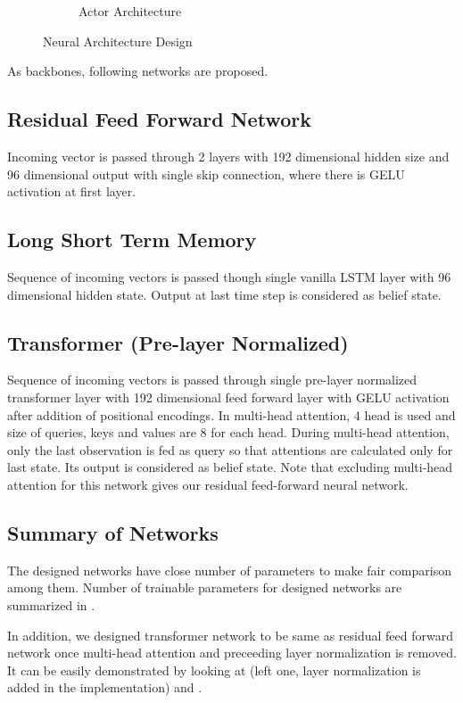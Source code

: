 \begin{figure}
\begin{subfigure}{.5\textwidth}
		\caption{Actor Architecture}
		\label{fig:actor_net}
	\end{subfigure}
	\caption{Neural Architecture Design}
	\label{fig:nets}
\end{figure}

As backbones, following networks are proposed. 

\subsection{Residual Feed Forward Network}

Incoming vector is passed through 2 layers with 192 dimensional hidden size and 96 dimensional output with single skip connection, where there is GELU activation at first layer. 

\subsection{Long Short Term Memory}

Sequence of incoming vectors is passed though single vanilla LSTM layer with 96 dimensional hidden state. 
Output at last time step is considered as belief state. 

\subsection{Transformer (Pre-layer Normalized)}

Sequence of incoming vectors is passed through single pre-layer normalized transformer layer with 192 dimensional feed forward layer with GELU activation after addition of positional encodings.
In multi-head attention, 4 head is used and size of queries, keys and values are 8 for each head.
During multi-head attention, only the last observation is fed as query so that attentions are calculated only for last state.  
Its output is considered as belief state.
Note that excluding multi-head attention for this network gives our residual feed-forward neural network.

\subsection{Summary of Networks}

The designed networks have close number of parameters to make fair comparison among them. 
Number of trainable parameters for designed networks are summarized in .

In addition, we designed transformer network to be same as residual feed forward network once multi-head attention and preceeding layer normalization is removed. 
It can be easily demonstrated by looking at  (left one, layer normalization is added in the implementation) and .

